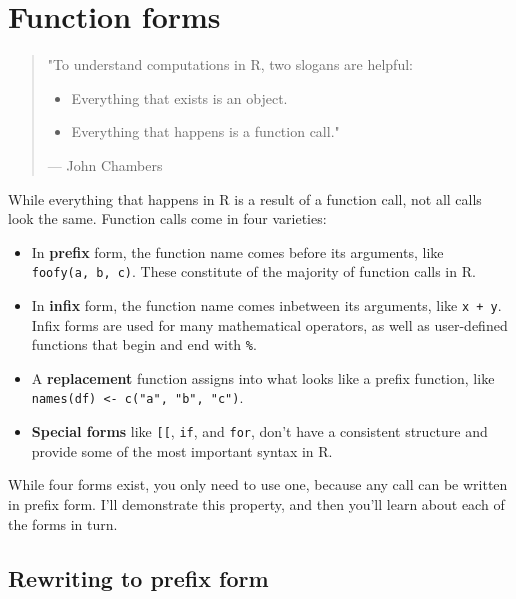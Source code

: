 \documentclass[]{book}
\providecommand{\tightlist}{%
  \setlength{\itemsep}{0pt}\setlength{\parskip}{0pt}}
\theoremstyle{definition}
\theoremstyle{definition}
\theoremstyle{definition}
\theoremstyle{remark}
\begin{document}
\hypertarget{function-forms}{%
\section{Function forms}\label{function-forms}}

\begin{quote}
"To understand computations in R, two slogans are helpful:

\begin{itemize}
\tightlist
\item
  Everything that exists is an object.
\item
  Everything that happens is a function call."
\end{itemize}

--- John Chambers
\end{quote}

While everything that happens in R is a result of a function call, not
all calls look the same. Function calls come in four varieties:

\begin{itemize}
\item
  In \textbf{prefix} form, the function name comes before its arguments,
  like \texttt{foofy(a,\ b,\ c)}. These constitute of the majority of
  function calls in R.
\item
  In \textbf{infix} form, the function name comes inbetween its
  arguments, like \texttt{x\ +\ y}. Infix forms are used for many
  mathematical operators, as well as user-defined functions that begin
  and end with \texttt{\%}.
\item
  A \textbf{replacement} function assigns into what looks like a prefix
  function, like \texttt{names(df)\ \textless{}-\ c("a",\ "b",\ "c")}.
\item
  \textbf{Special forms} like \texttt{{[}{[}}, \texttt{if}, and
  \texttt{for}, don't have a consistent structure and provide some of
  the most important syntax in R.
\end{itemize}

While four forms exist, you only need to use one, because any call can
be written in prefix form. I'll demonstrate this property, and then
you'll learn about each of the forms in turn.

\hypertarget{rewriting-to-prefix-form}{%
\subsection{Rewriting to prefix form}\label{rewriting-to-prefix-form}}
\end{document}
